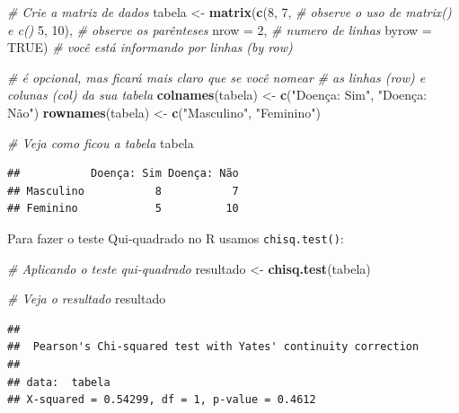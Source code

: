 \documentclass[
]{book}
\newenvironment{Shaded}{\begin{snugshade}}{\end{snugshade}}
\newcommand{\AttributeTok}[1]{\textcolor[rgb]{0.13,0.29,0.53}{#1}}
\newcommand{\CommentTok}[1]{\textcolor[rgb]{0.56,0.35,0.01}{\textit{#1}}}
\newcommand{\ConstantTok}[1]{\textcolor[rgb]{0.56,0.35,0.01}{#1}}
\newcommand{\DecValTok}[1]{\textcolor[rgb]{0.00,0.00,0.81}{#1}}
\newcommand{\FunctionTok}[1]{\textcolor[rgb]{0.13,0.29,0.53}{\textbf{#1}}}
\newcommand{\NormalTok}[1]{#1}
\newcommand{\OtherTok}[1]{\textcolor[rgb]{0.56,0.35,0.01}{#1}}
\newcommand{\StringTok}[1]{\textcolor[rgb]{0.31,0.60,0.02}{#1}}
\begin{document}
\begin{Shaded}
\begin{Highlighting}[]
\CommentTok{\# Crie a matriz de dados}
\NormalTok{tabela }\OtherTok{\textless{}{-}} \FunctionTok{matrix}\NormalTok{(}\FunctionTok{c}\NormalTok{(}\DecValTok{8}\NormalTok{, }\DecValTok{7}\NormalTok{,       }\CommentTok{\# observe o uso de matrix() e c()}
                   \DecValTok{5}\NormalTok{, }\DecValTok{10}\NormalTok{),     }\CommentTok{\# observe os parênteses  }
                 \AttributeTok{nrow =} \DecValTok{2}\NormalTok{,     }\CommentTok{\# numero de linhas }
                 \AttributeTok{byrow =} \ConstantTok{TRUE}\NormalTok{) }\CommentTok{\# você está informando por linhas (by row)}
                 
\CommentTok{\# é opcional, mas ficará mais claro que se você nomear }
\CommentTok{\# as linhas (row) e colunas (col) da sua tabela}
\FunctionTok{colnames}\NormalTok{(tabela) }\OtherTok{\textless{}{-}} \FunctionTok{c}\NormalTok{(}\StringTok{"Doença: Sim"}\NormalTok{, }\StringTok{"Doença: Não"}\NormalTok{)}
\FunctionTok{rownames}\NormalTok{(tabela) }\OtherTok{\textless{}{-}} \FunctionTok{c}\NormalTok{(}\StringTok{"Masculino"}\NormalTok{, }\StringTok{"Feminino"}\NormalTok{)}

\CommentTok{\# Veja como ficou a tabela}
\NormalTok{tabela}
\end{Highlighting}
\end{Shaded}

\begin{verbatim}
##           Doença: Sim Doença: Não
## Masculino           8           7
## Feminino            5          10
\end{verbatim}

Para fazer o teste Qui-quadrado no R usamos \texttt{chisq.test()}:

\begin{Shaded}
\begin{Highlighting}[]
\CommentTok{\# Aplicando o teste qui{-}quadrado}
\NormalTok{resultado }\OtherTok{\textless{}{-}} \FunctionTok{chisq.test}\NormalTok{(tabela)}

\CommentTok{\# Veja o resultado}
\NormalTok{resultado}
\end{Highlighting}
\end{Shaded}

\begin{verbatim}
## 
##  Pearson's Chi-squared test with Yates' continuity correction
## 
## data:  tabela
## X-squared = 0.54299, df = 1, p-value = 0.4612
\end{verbatim}
\end{document}
